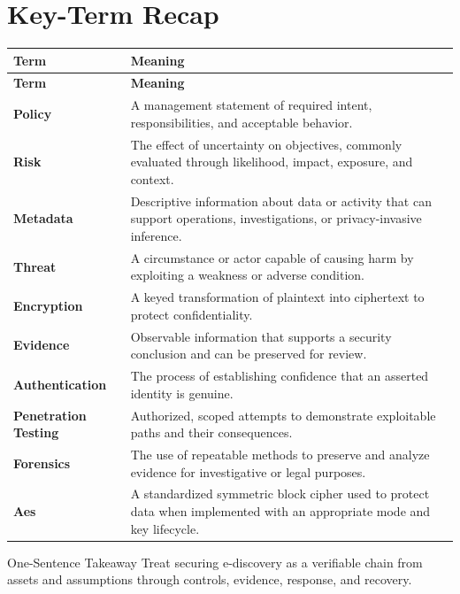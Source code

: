 \documentclass[11pt,letterpaper]{article}
\begin{document}
\section*{Key-Term Recap}
\begin{longtable}{>{\raggedright\arraybackslash}p{}>{\raggedright\arraybackslash}p{}}
\toprule\rowcolor{Navy}\color{white}\textbf{Term} & \color{white}\textbf{Meaning}\\\midrule
\endfirsthead
\toprule\rowcolor{Navy}\color{white}\textbf{Term} & \color{white}\textbf{Meaning}\\\midrule
\endhead
\textbf{Policy} & A management statement of required intent, responsibilities, and acceptable behavior. \\\midrule
\textbf{Risk} & The effect of uncertainty on objectives, commonly evaluated through likelihood, impact, exposure, and context. \\\midrule
\textbf{Metadata} & Descriptive information about data or activity that can support operations, investigations, or privacy-invasive inference. \\\midrule
\textbf{Threat} & A circumstance or actor capable of causing harm by exploiting a weakness or adverse condition. \\\midrule
\textbf{Encryption} & A keyed transformation of plaintext into ciphertext to protect confidentiality. \\\midrule
\textbf{Evidence} & Observable information that supports a security conclusion and can be preserved for review. \\\midrule
\textbf{Authentication} & The process of establishing confidence that an asserted identity is genuine. \\\midrule
\textbf{Penetration Testing} & Authorized, scoped attempts to demonstrate exploitable paths and their consequences. \\\midrule
\textbf{Forensics} & The use of repeatable methods to preserve and analyze evidence for investigative or legal purposes. \\\midrule
\textbf{Aes} & A standardized symmetric block cipher used to protect data when implemented with an appropriate mode and key lifecycle. \\\midrule
\bottomrule
\end{longtable}
\begin{CornellExamBox}{One-Sentence Takeaway}
Treat securing e-discovery as a verifiable chain from assets and assumptions through controls, evidence, response, and recovery.
\end{CornellExamBox}
\end{document}
